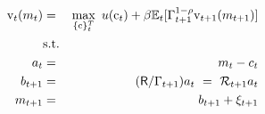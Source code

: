 \begin{eqnarray}
\mathrm{v}_{t}(m_{t}) & = & \max_{\{\mathrm{c}\}_{t}^{T}}~  u(\mathrm{c}_{t}) +\beta \mathbb{E}_{t}[\Gamma_{t+1}^{1-\rho}\mathrm{v}_{t+1}({m}_{t+1})]  \label{eq:veqn} \\
& \mbox{s.t.} &  \notag
 \\ {a}_{t} & = & m_{t}-c_{t}  \label{eq:smalls} \notag
 \\ {b}_{t+1} & = & (\mathsf{R}/\Gamma_{t+1})a_{t}  ~ = ~ \mathcal{R}_{t+1}a_{t}  \notag \label{eq:smallb}
\\ m_{t+1} & = & b_{t+1}+\xi_{t+1}  \notag %
\end{eqnarray}
